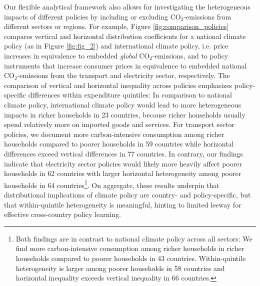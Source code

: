 \documentclass[12pt, a4paper]{article}
\begin{document}
Our flexible analytical framework also allows for investigating the heterogeneous impacts of different policies by including or excluding CO$_{2}$-emissions from different sectors or regions. For example, Figure \ref{fig:comparison_policies} compares vertical and horizontal distribution coefficients for a national climate policy (as in Figure \ref{fig:fig_2}) and international climate policy, i.e. price increases in equivalence to embedded \textit{global} CO$_{2}$-emissions, and to policy instruments that increase consumer prices in equivalence to embedded national CO$_{2}$-emissions from the transport and electricity sector, respectively.  The comparison of vertical and horizontal inequality across policies emphasizes policy-specific differences within expenditure quintiles: In comparison to national climate policy, international climate policy would lead to more heterogeneous impacts in richer households in 23 countries, because richer households usually spend relatively more on imported goods and services. For transport sector policies, we document more carbon-intensive consumption among richer households compared to poorer households in 59 countries while horizontal differences exceed vertical differences in 77 countries. In contrary, our findings indicate that electricity sector policies would likely more heavily affect poorer households in 62 countries with larger horizontal heterogeneity among poorer households in 64 countries\footnote{Both findings are in contrast to national climate policy across all sectors: We find more carbon-intensive consumption among richer households in richer households compared to poorer households in 43 countries. Within-quintile heterogeneity is larger among poorer households in 58 countries and horizontal inequality exceeds vertical inequality in 66 countries.}. 
On aggregate, these results underpin that distributional implications of climate policy are country- and policy-specific, but that within-quintile heterogeneity is meaningful, hinting to limited leeway for effective cross-country policy learning.

\end{document}
